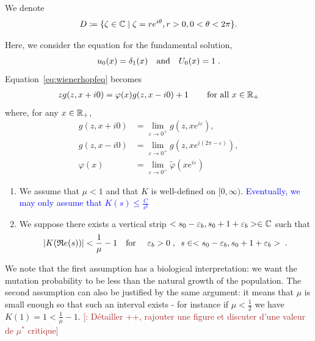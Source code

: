 \documentclass[11pt]{amsart}
\renewcommand{\Re}{\mathfrak{R}e}
\newcommand{\blue}[1]{\textcolor{blue}{#1}}
\newcommand{\ndr}[1]{\textcolor{brown}{[#1]}}
\begin{document}
We denote 
\begin{equation}\label{def:D}
D \coloneqq \{ \zeta \in \mathbb{C} \mid \zeta = re^{i\theta}, r > 0, 0 < \theta < 2\pi \}.
\end{equation}


Here, we consider the equation for the fundamental solution, \ie 
$$u_0(x) = \delta_1(x) \quad \text{and} \quad U_0(x) = 1 \; .$$ Equation~\eqref{eq:wienerhopfeq} becomes
\begin{align}
    \label{eq:WH3.5}
    z g(z, x+i0) = \varphi(x)g(z, x-i0) + 1 \, \qquad \text{for all $x\in\mathbb{R}_+$}
\end{align}
where, for any $x \in \mathbb{R}_+$, 
\begin{align*}
    g(z, x+i0) &= \lim_{\varepsilon\to 0^+}  g(z, xe^{i\varepsilon}),\\
    g(z, x-i0) &= \lim_{\varepsilon\to 0^+}  g(z, xe^{i(2\pi-\varepsilon)}),\\
    \varphi(x) &= \lim_{\varepsilon\to 0^+}\tilde \varphi(xe^{i\varepsilon}) 
\end{align*}

\begin{hypothesis}\label{hyp:boundK} \mbox{}
    \begin{enumerate}
        \item We assume that $\mu < 1$ and that $K$ is well-defined on $[0, \infty)$.  \blue{Eventually, we may only assume that $K(s) \leq \frac{C}{s^k}$} 
        \item We suppose there exists a vertical strip $<s_0-\varepsilon_b, s_0+1+\varepsilon_b> \in \mathbb{C}$ such that 
        $$|K(\Re(s))| < \frac{1}{\mu} - 1
        \mtext{for } \varepsilon_b > 0 \eqsepv s \in <s_0-\varepsilon_b, s_0+1+\varepsilon_b>\eqfinp$$ 
    \end{enumerate}
\end{hypothesis}
We note that the first assumption has a biological interpretation: we want the mutation probability to be less than the natural growth of the population. The second assumption can also be justified by the same argument: it means that $\mu$ is small enough so that  such an interval exists - for instance if $\mu<\frac{1}{2}$ we have $K(1)=1<\frac{1}{\mu}-1.$  \ndr{: Détailler ++, rajouter une figure et discuter d'une valeur de $\mu^* $ critique}
\end{document}
